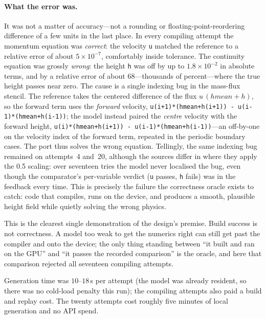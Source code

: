 \documentclass[11pt]{article}
\newcommand{\code}[1]{\texttt{#1}}
\begin{document}
\paragraph{What the error was.} It was not a matter of accuracy---not a rounding
or floating-point-reordering difference of a few units in the last place. In
every compiling attempt the momentum equation was \emph{correct}: the velocity
\code{u} matched the reference to a relative error of about $5\times10^{-7}$,
comfortably inside tolerance. The continuity equation was grossly \emph{wrong}:
the height \code{h} was off by up to $1.8\times10^{-2}$ in absolute terms, and by
a relative error of about $68$---thousands of percent---where the true height
passes near zero. The cause is a single indexing bug in the mass-flux stencil.
The reference takes the centered difference of the flux $u\,(hmean+h)$, so the
forward term uses the \emph{forward} velocity,
\code{u(i+1)*(hmean+h(i+1)) - u(i-1)*(hmean+h(i-1))}; the model instead paired the
\emph{centre} velocity with the forward height,
\code{u(i)*(hmean+h(i+1)) - u(i-1)*(hmean+h(i-1))}---an off-by-one on the velocity
index of the forward term, repeated in the periodic boundary cases. The port thus
solves the wrong equation. Tellingly, the same indexing bug remained on
attempts~4 and~20, although the sources differ in where they apply the 0.5
scaling: over seventeen tries the model never localised the bug,
even though the comparator's per-variable verdict (\code{u} passes, \code{h}
fails) was in the feedback every time. This is precisely the failure the
correctness oracle exists to catch: code that compiles, runs on the device, and
produces a smooth, plausible height field while quietly solving the wrong physics.

This is the clearest single demonstration of the design's premise. Build success
is not correctness. A model too weak to get the numerics right can still get past
the compiler and onto the device; the only thing standing between ``it built and
ran on the GPU'' and ``it passes the recorded comparison'' is the oracle, and
here that comparison rejected all seventeen compiling attempts.

Generation time was $10$--$18$\,s per attempt (the model was already resident, so
there was no cold-load penalty this run); the compiling attempts also paid a
build and replay cost. The twenty attempts cost roughly five minutes of local
generation and no API spend.
\end{document}
